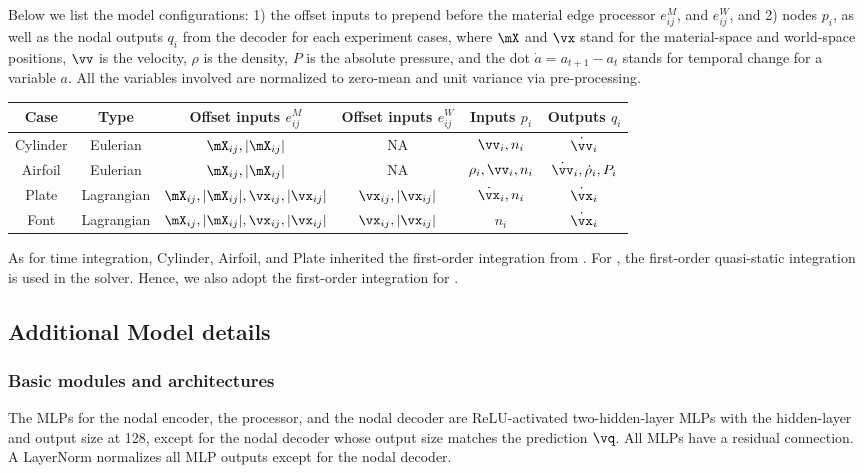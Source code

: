 Below we list the model configurations: 1) the offset inputs to prepend before the material edge processor $e^{M}_{ij}$, and $e^{W}_{ij}$, and 2) nodes $p_i$, as well as the nodal outputs $q_i$ from the decoder for each experiment cases, where $\mX$ and $\vx$ stand for the material-space and world-space positions, $\vv$ is the velocity, $\rho$ is the density, $P$ is the absolute pressure, and the dot $\dot{a} = a_{t+1} - a_t$ stands for temporal change for a variable $a$. All the variables involved are normalized to zero-mean and unit variance via pre-processing.
\begin{table}[h]
    \centering
    \label{tab:model:inputs}
    \begin{tabular}{cccccc}
        \textbf{Case} & \textbf{Type} & \textbf{Offset inputs }$e^{M}_{ij}$       & \textbf{Offset inputs }$e^{W}_{ij}$ & \textbf{Inputs }$p_i$ & \textbf{Outputs }$q_i$         \\ \hline
        Cylinder      & Eulerian      & $\mX_{ij},|\mX_{ij}|$                     & NA                                  & $\vv_i,n_i$           & $\dot{\vv}_i$                  \\
        Airfoil       & Eulerian      & $\mX_{ij},|\mX_{ij}|$                     & NA                                  & $\rho_i,\vv_i,n_i$    & $\dot{\vv}_i,\dot{\rho}_i,P_i$ \\
        Plate         & Lagrangian    & $\mX_{ij},|\mX_{ij}|,\vx_{ij},|\vx_{ij}|$ & $\vx_{ij},|\vx_{ij}|$               & $\dot{\vx}_i,n_i$     & $\dot{\vx}_i$                  \\
        Font          & Lagrangian    & $\mX_{ij},|\mX_{ij}|,\vx_{ij},|\vx_{ij}|$ & $\vx_{ij},|\vx_{ij}|$               & $n_i$                 & $\dot{\vx}_i$
    \end{tabular}
\end{table}

As for time integration, Cylinder, Airfoil, and Plate inherited the first-order integration from \flatGNN. For \fonts, the first-order quasi-static integration\ \cite{fang2021guaranteed} is used in the solver. Hence, we also adopt the first-order integration for \fonts.
\subsection{Additional Model details}
\label{sec:appdx:arch}
\subsubsection{Basic modules and architectures}
The MLPs for the nodal encoder, the processor, and the nodal decoder are ReLU-activated two-hidden-layer MLPs with the hidden-layer and output size at 128, except for the nodal decoder whose output size matches the prediction $\vq$. All MLPs have a residual connection. A LayerNorm normalizes all MLP outputs except for the nodal decoder.
